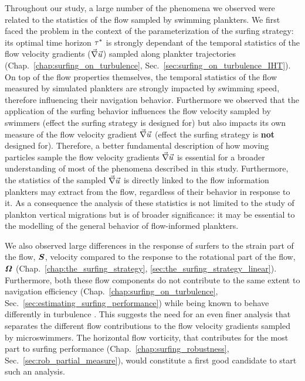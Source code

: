 Throughout our study, a large number of the phenomena we observed were related to the statistics of the flow sampled by swimming plankters.
We first faced the problem in the context of the parameterization of the surfing strategy: its optimal time horizon $\tau^*$ is strongly dependant of the temporal statistics of the flow velocity gradients ($\vec{\nabla} \vec{u}$) sampled along plankter trajectories (Chap.~\ref{chap:surfing_on_turbulence}, Sec.~\ref{sec:surfing_on_turbulence_IHT}).
On top of the flow properties themselves, the temporal statistics of the flow measured by simulated plankters are strongly impacted by swimming speed, therefore influencing their navigation behavior.
Furthermore we observed that the application of the surfing behavior influences the flow velocity sampled by swimmers (effect the surfing strategy is designed for) but also impacts its own measure of the flow velocity gradient $\vec{\nabla} \vec{u}$ (effect the surfing strategy is \textbf{not} designed for).
Therefore, a better fundamental description of how moving particles sample the flow velocity gradients $\vec{\nabla} \vec{u}$ is essential for a broader understanding of most of the phenomena described in this study.
Furthermore, the statistics of the sampled $\vec{\nabla} \vec{u}$ is directly linked to the flow information plankters may extract from the flow, regardless of their behavior in response to it.
As a consequence the analysis of these statistics is not limited to the study of plankton vertical migrations but is of broader significance: it may be essential to the modelling of the general behavior of flow-informed plankters.

We also observed large differences in the response of surfers to the strain part of the flow, $\boldsymbol{S}$, velocity compared to the response to the rotational part of the flow, $\boldsymbol{\varOmega}$ (Chap.~\ref{chap:the_surfing_strategy}, \ref{sec:the_surfing_strategy_linear}).
Furthermore, both these flow components do not contribute to the same extent to navigation efficiency (Chap.~\ref{chap:surfing_on_turbulence}, Sec.~\ref{sec:estimating_surfing_performance}) while being known to behave differently in turbulence \citep{buaria2022vorticity}.
This suggests the need for an even finer analysis that separates the different flow contributions to the flow velocity gradients sampled by microswimmers.
The horizontal flow vorticity, that contributes for the most part to surfing performance (Chap.~\ref{chap:surfing_robustness}, Sec.~\ref{sec:rob_partial_measure}), would constitute a first good candidate to start such an analysis.

